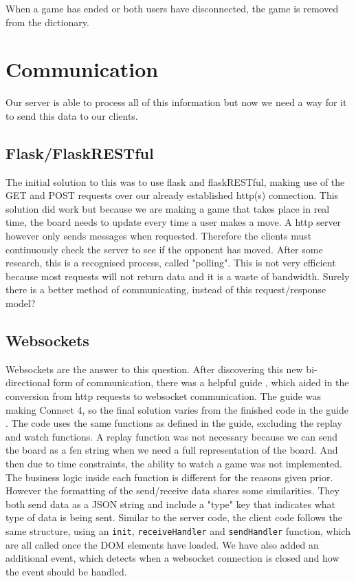 When a game has ended or both users have disconnected, the game is removed from the dictionary.

\section{Communication}

Our server is able to process all of this information but now we need a way for it to send this data to our clients.

\subsection{Flask/FlaskRESTful}

The initial solution to this was to use flask and flaskRESTful, making use of the GET and POST requests over our already established http(s) connection. This solution did work but because we are making a game that takes place in real time, the board needs to update every time a user makes a move. A http server however only sends messages when requested. Therefore the clients must continuously check the server to see if the opponent has moved. After some research, this is a recognised process, called "polling". This is not very efficient because most requests will not return data and it is a waste of bandwidth. Surely there is a better method of communicating, instead of this request/response model?

\subsection{Websockets}
\label{Websockets}

Websockets are the answer to this question. After discovering this new bi-directional form of communication, there was a helpful guide \cite{Websockets}, which aided in the conversion from http requests to websocket communication. The guide was making Connect 4, so the final solution varies from the finished code in the guide \cite{CompleteCode}. The code uses the same functions as defined in the guide, excluding the replay and watch functions. A replay function was not necessary because we can send the board as a fen string when we need a full representation of the board. And then due to time constraints, the ability to watch a game was not implemented. The business logic inside each function is different for the reasons given prior. However the formatting of the send/receive data shares some similarities. They both send data as a JSON string and include a "type" key that indicates what type of data is being sent. Similar to the server code, the client code follows the same structure, using an \lstinline{init}, \lstinline{receiveHandler} and \lstinline{sendHandler} function, which are all called once the DOM elements have loaded. We have also added an additional event, which detects when a websocket connection is closed and how the event should be handled.


